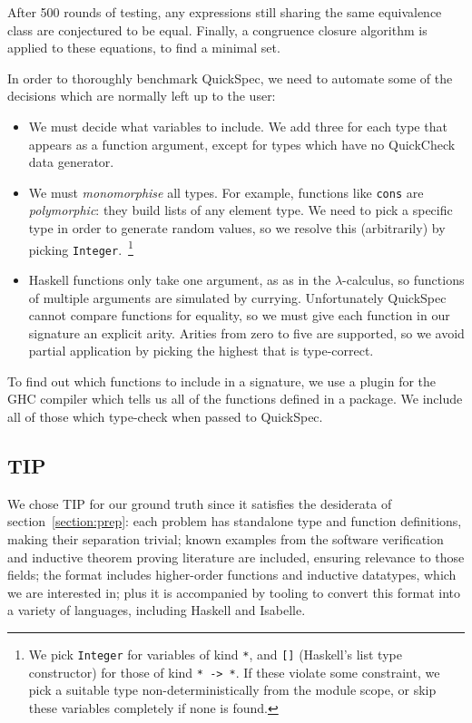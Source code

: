After 500 rounds of testing, any expressions still sharing the same equivalence
class are conjectured to be equal. Finally, a congruence closure algorithm is
applied to these equations, to find a minimal set.

In order to thoroughly benchmark QuickSpec, we need to automate some of the
decisions which are normally left up to the user:

\begin{itemize}
\item We must decide what variables to include. We add three for each type that
  appears as a function argument, except for types which have no QuickCheck data
  generator.
\item We must \emph{monomorphise} all types. For example, functions like
  \texttt{cons} are \emph{polymorphic}: they build lists of any element type.
  We need to pick a specific type in order to generate random values, so we
  resolve this (arbitrarily) by picking
  \texttt{Integer}.~\footnote{We pick \texttt{Integer} for variables of kind
    \texttt{*}, and \texttt{[]} (Haskell's list type constructor) for those of
    kind \texttt{* -> *}. If these violate some constraint, we pick a suitable
    type non-deterministically from the module scope, or skip these variables
    completely if none is found.}
\item Haskell functions only take one argument, as as in the $\lambda$-calculus,
  so functions of multiple arguments are simulated by currying.
  Unfortunately QuickSpec cannot compare functions for equality, so we must give
  each function in our signature an explicit arity. Arities from zero to five
  are supported, so we avoid partial application by picking the highest that is
  type-correct.
\end{itemize}

To find out which functions to include in a signature, we use a plugin for the
GHC compiler which tells us all of the functions defined in a package. We
include all of those which type-check when passed to QuickSpec.

\subsection{TIP}

We chose TIP for our ground truth since it satisfies the desiderata of
section~\ref{section:prep}: each problem has standalone type and function
definitions, making their separation trivial; known examples from the software
verification and inductive theorem proving literature are included, ensuring
relevance to those fields; the format includes higher-order functions and
inductive datatypes, which we are interested in; plus it is accompanied by
tooling to convert this format into a variety of languages, including Haskell
and Isabelle.

